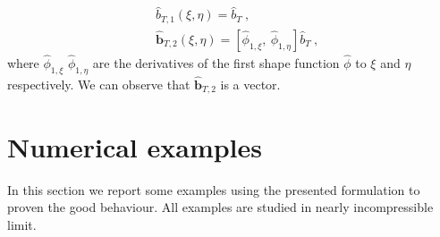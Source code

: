 \documentclass[preprint,12pt,authoryear]{elsarticle}
\begin{document}
\begin{equation}
\begin{split}
&\hat{b}_{T,1}(\xi,\eta) = \hat{b}_{T}\:, \\
&\hat{\bm{b}}_{T,2}(\xi,\eta) = \left[\hat{\phi}_{1,\xi},\: 
\hat{\phi}_{1,\eta}\right]\hat{b}_{T}\:,
\end{split}
\end{equation}
where $\hat{\phi}_{1,\xi}$ $\hat{\phi}_{1,\eta}$ are the derivatives of the first shape function $\hat{\phi}$ to $\xi$ and $\eta$ respectively.
We can observe that $\hat{\bm{b}}_{T,2}$ is a vector. 

\section{Numerical examples}\label{sec:five}
In this section we report some examples using the presented formulation to proven the good behaviour. All examples are studied in nearly incompressible limit.
\end{document}
